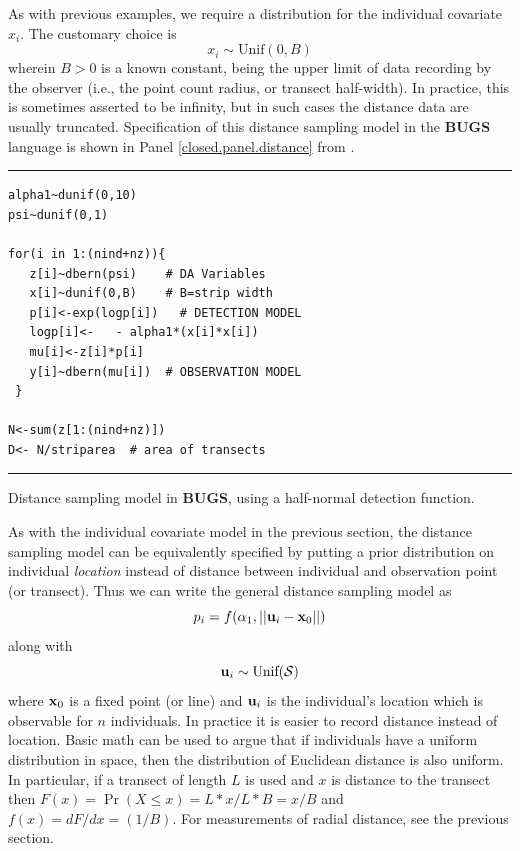 As with previous examples, we require a distribution for the
individual covariate $x_{i}$. The customary choice is
\[
x_{i} \sim \mbox{Unif}(0,B)
\]
wherein $B>0$ is a known constant, being the upper limit of data
recording by the observer (i.e., the point count radius, or transect
half-width). In practice, this is sometimes asserted to be infinity,
but in such cases the distance data are usually truncated.
Specification of this distance sampling model in the {\bf BUGS} language is
shown in Panel \ref{closed.panel.distance} from \citet{royle_dorazio:2008}.


\begin{panel}[htp]
\centering
\rule[0.15in]{\textwidth}{.03in}
\begin{minipage}{5in}
\begin{verbatim}
alpha1~dunif(0,10)
psi~dunif(0,1)

for(i in 1:(nind+nz)){
   z[i]~dbern(psi)    # DA Variables
   x[i]~dunif(0,B)    # B=strip width
   p[i]<-exp(logp[i])   # DETECTION MODEL
   logp[i]<-   - alpha1*(x[i]*x[i])
   mu[i]<-z[i]*p[i]
   y[i]~dbern(mu[i])  # OBSERVATION MODEL
 }

N<-sum(z[1:(nind+nz)])
D<- N/striparea  # area of transects
\end{verbatim}
\end{minipage}
\rule[-0.15in]{\textwidth}{.03in}
\caption{Distance sampling model in {\bf BUGS}, using a half-normal
detection function.}
\label{closed.panel.distance}
\end{panel}

As with the individual covariate model in the previous section, the
distance sampling model can be equivalently specified by putting a
prior distribution on individual {\it location} instead of distance
between individual and observation point (or transect).  Thus we can
write the general distance sampling model as
\[
p_{i} = f(\alpha_{1},||{\bf u}_{i} - {\bf x}_0||)
\]
along with
\[
 {\bf u}_{i} \sim \mbox{Unif}({\cal S})
\]
where ${\bf x}_{0}$ is a fixed point (or line) and ${\bf u}_{i}$ is
the individual's location which is observable for $n$ individuals. In
practice it is easier to record distance instead of location.  Basic
math can be used to argue that if individuals have a uniform
distribution in space, then the distribution of Euclidean distance is
also uniform. In particular, if a transect of length $L$ is used and $x$
is distance to the transect then $F(x) = \Pr(X\le x) = L*x/L*B = x/B$ and
$f(x) = dF/dx = (1/B)$. For measurements of radial distance, see the
previous section.

